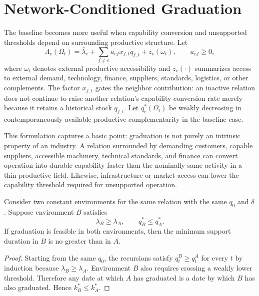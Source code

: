\section{Network-Conditioned Graduation}
\label{sec:network}

The baseline becomes more useful when capability conversion and unsupported thresholds depend on surrounding productive structure. Let
\begin{equation}
\Lambda_e(\Omega_t)
=
\bar\lambda_e
+\sum_{f\neq e}a_{ef}x_{f,t}q_{f,t}
+z_e(\omega_t),
\qquad a_{ef}\ge0,
\label{eq:network-lambda}
\end{equation}
where $\omega_t$ denotes external productive accessibility and $z_e(\cdot)$ summarizes access to external demand, technology, finance, suppliers, standards, logistics, or other complements. The factor $x_{f,t}$ gates the neighbor contribution: an inactive relation does not continue to raise another relation's capability-conversion rate merely because it retains a historical stock $q_{f,t}$. Let $q_e^*(\Omega_t)$ be weakly decreasing in contemporaneously available productive complementarity in the baseline case.

This formulation captures a basic point: graduation is not purely an intrinsic property of an industry. A relation surrounded by demanding customers, capable suppliers, accessible machinery, technical standards, and finance can convert operation into durable capability faster than the nominally same activity in a thin productive field. Likewise, infrastructure or market access can lower the capability threshold required for unsupported operation.

\begin{proposition}
\label{prop:path-dominance}
Consider two constant environments for the same relation with the same $q_0$ and $\delta$. Suppose environment $B$ satisfies
\[
\lambda_B\ge\lambda_A,
\qquad
q_B^*\le q_A^*.
\]
If graduation is feasible in both environments, then the minimum support duration in $B$ is no greater than in $A$.
\end{proposition}

\begin{proof}
Starting from the same $q_0$, the recursions satisfy $q^B_t\ge q^A_t$ for every $t$ by induction because $\lambda_B\ge\lambda_A$. Environment $B$ also requires crossing a weakly lower threshold. Therefore any date at which $A$ has graduated is a date by which $B$ has also graduated. Hence $k_B^*\le k_A^*$.
\end{proof}

